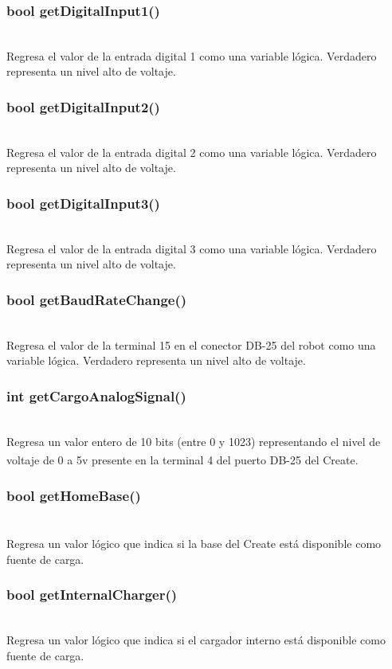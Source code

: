 \documentclass[letterpaper]{book}
\begin{document}
\subsubsection{bool getDigitalInput1()}\mbox{}\\
Regresa el valor de la entrada digital 1 como una variable lógica. Verdadero representa un nivel alto de voltaje.\\
\subsubsection{bool getDigitalInput2()}\mbox{}\\
Regresa el valor de la entrada digital 2 como una variable lógica. Verdadero representa un nivel alto de voltaje.\\
\subsubsection{bool getDigitalInput3()}\mbox{}\\
Regresa el valor de la entrada digital 3 como una variable lógica. Verdadero representa un nivel alto de voltaje.\\
\subsubsection{bool getBaudRateChange()}\mbox{}\\
Regresa el valor de la terminal 15 en el conector DB-25 del robot como una variable lógica. Verdadero representa un nivel alto de voltaje.\\
\subsubsection{int getCargoAnalogSignal()}\mbox{}\\
Regresa un valor entero de 10 bits (entre 0 y 1023) representando el nivel de voltaje de 0 a 5v presente en la terminal 4 del puerto DB-25 del Create\textsuperscript{\textregistered}.\\
\subsubsection{bool getHomeBase()}\mbox{}\\
Regresa un valor lógico que indica si la base del Create\textsuperscript{\textregistered} está disponible como fuente de carga.\\
\subsubsection{bool getInternalCharger()}\mbox{}\\
Regresa un valor lógico que indica si el cargador interno está disponible como fuente de carga.\\
\end{document}
